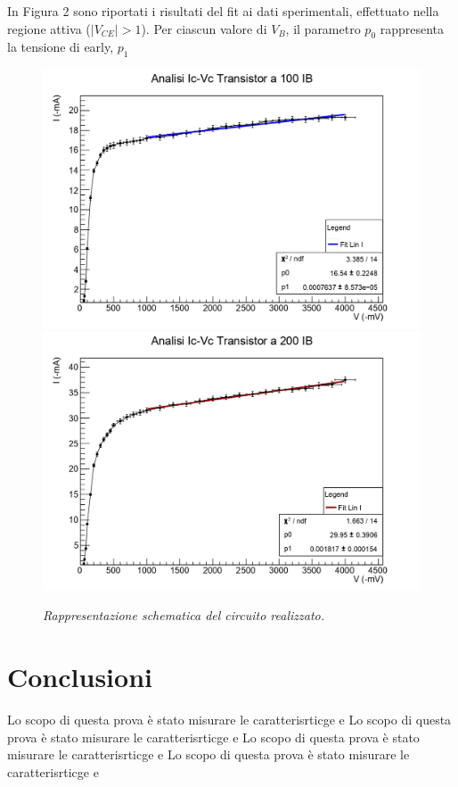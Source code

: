\documentclass{article}
\begin{document}
In Figura 2 sono riportati i risultati del fit ai dati sperimentali, effettuato nella regione attiva ($|V_{CE}|>1$). Per ciascun valore di $V_B$, il parametro
$p_0$ rappresenta la tensione di early, $p_1$

\begin{figure}[]
  \centering
  \includegraphics[scale=0.55]{Trans100.jpg}
  \qquad
  \includegraphics[scale=0.55]{Trans200.jpg}
  \qquad
  \caption{\textit{Rappresentazione schematica del circuito realizzato. }}
\end{figure}



\section{Conclusioni}


Lo scopo di questa prova è stato misurare le caratterisrticge e 
Lo scopo di questa prova è stato misurare le caratterisrticge e 
Lo scopo di questa prova è stato misurare le caratterisrticge e 
Lo scopo di questa prova è stato misurare le caratterisrticge e 
\end{document}
